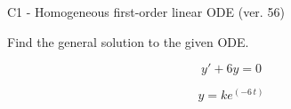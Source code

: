 \begin{exercise}
  \begin{exerciseTitle}C1 - Homogeneous first-order linear ODE (ver. 56)\end{exerciseTitle}
  \begin{exerciseStatement}
    
Find the general solution to the given ODE.

    
\[y'+6y=0\]

  \end{exerciseStatement}
  \begin{exerciseAnswer}
    
\[y= k e^{\left(-6 \, t\right)}\]

  \end{exerciseAnswer}
\end{exercise}